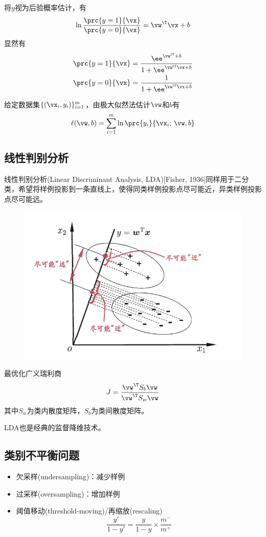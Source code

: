 将$y$视为后验概率估计，有
\[\ln\frac{\prc{y=1}{\vx}}{\prc{y=0}{\vx}}=\vw^\T\vx+b\]
显然有
\[\begin{aligned}
\prc{y=1}{\vx}&=\frac{\ee^{\vw^\T+b}}{1+\ee^{\vw^\T\vx+b}}\\
\prc{y=0}{\vx}&=\frac{1}{1+\ee^{\vw^\T\vx+b}}
\end{aligned}\]

给定数据集$\{(\vx_i,y_i)\}_{i=1}^m$，由极大似然法估计$\vw$和$b$有
\[\ell(\vw,b)=\sum_{i=1}^m\ln\prc{y_i}{\vx_i;\,\vw,b}\]

\subsection{线性判别分析}
线性判别分析(Linear Discriminant Analysis, LDA)[Fisher, 1936]同样用于二分类，希望将样例投影到一条直线上，使得同类样例投影点尽可能近，异类样例投影点尽可能远。
\begin{figure}[H]
\centering
\includegraphics[width=0.5\linewidth]{fig/LDA.png}
\end{figure}

最优化广义瑞利商
\[J=\frac{\vw^\T S_b\vw}{\vw^\T S_w\vw}\]
其中$S_w$为类内散度矩阵，$S_b$为类间散度矩阵。

LDA也是经典的监督降维技术。

\subsection{类别不平衡问题}
\begin{itemize}
	\item 欠采样(undersampling)：减少样例
	\item 过采样(oversampling)：增加样例
	\item 阈值移动(threshold-moving)/再缩放(rescaling)
	\[\frac{y'}{1-y'}=\frac{y}{1-y}\times\frac{m^-}{m^+}\]
\end{itemize}